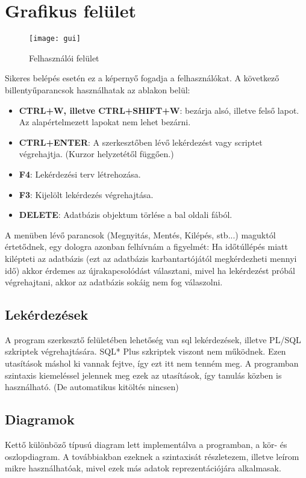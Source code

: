 \section{Grafikus felület}
\begin{figure}[ht]
    \texttt{[image: gui]}
 \caption{Felhasználói felület}
\end{figure}
Sikeres belépés esetén ez a képernyő fogadja a felhasználókat.
A következő billentyűparancsok használhatak az ablakon belül:
\begin{itemize}
  \item \textbf{CTRL+W, illetve CTRL+SHIFT+W}: bezárja alsó, illetve felső lapot. Az alapértelmezett lapokat nem lehet bezárni.
  \item \textbf{CTRL+ENTER}: A szerkesztőben lévő lekérdezést vagy scriptet végrehajtja. (Kurzor helyzetétől függően.)
  \item \textbf{F4}: Lekérdezési terv létrehozása.
  \item \textbf{F3}: Kijelölt lekérdezés végrehajtása.
  \item \textbf{DELETE}: Adatbázis objektum törlése a bal oldali fából.
\end{itemize}

A menüben lévő parancsok (Megnyitás, Mentés, Kilépés, stb...) maguktól értetődnek, egy dologra azonban
felhívnám a figyelmét: Ha időtúllépés miatt kilépteti az adatbázis (ezt az adatbázis karbantartójától megkérdezheti mennyi idő) akkor
érdemes az újrakapcsolódást választani, mivel ha lekérdezést próbál végrehajtani, akkor az adatbázis sokáig nem fog válaszolni.

\subsection{Lekérdezések}
A program szerkesztő felületében lehetőség van sql lekérdezések, illetve PL/SQL szkriptek végrehajtására. SQL* Plus szkriptek viszont
nem működnek. Ezen utasítások máshol ki vannak fejtve, így ezt itt nem tenném meg. A programban szintaxis kiemeléssel jelennek meg ezek
az utasítások, így tanulás közben is használható. (De automatikus kitöltés nincsen)

\subsection{Diagramok}
Kettő különböző típusú diagram lett implementálva a programban, a kör- és oszlopdiagram. A továbbiakban
ezeknek a szintaxisát részletezem, illetve leírom mikre használhatóak, mivel ezek más adatok
reprezentációjára alkalmasak.

